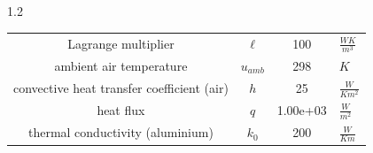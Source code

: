 \documentclass[preview]{standalone}
\begin{document}
\begin{spacing}{1.2}
\begin{tabular}{cccl}
\toprule
Lagrange multiplier & $\ell$ & 100 & $\frac{W K}{m^3}$ \\ 
ambient air temperature & $u_{amb}$ & 298 & $K$ \\ 
convective heat transfer coefficient (air) & $h$ & 25 & $\frac{W}{K m^2}$ \\ 
heat flux & $q$ & 1.00e+03 & $\frac{W}{m^2}$ \\ 
thermal conductivity (aluminium) & $k_{0}$ & 200 & $\frac{W}{K m}$ \\ 
\bottomrule
\end{tabular}
\end{spacing}
\end{document}
